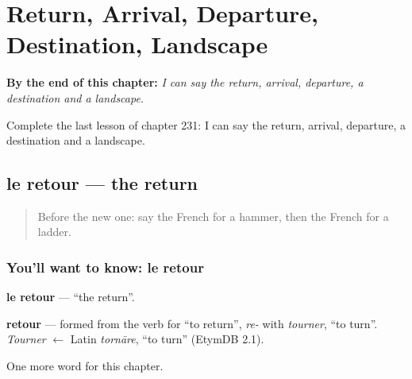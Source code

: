 
\chapter{Return, Arrival, Departure, Destination, Landscape}
\label{ch:fr-return-arrival-departure-destination-landscape}

\begin{chapteropening}
\textbf{By the end of this chapter:} \emph{I can say the return, arrival, departure, a destination and a landscape.}

Complete the last lesson of chapter 231: I can say the return, arrival, departure, a destination and a landscape.
\end{chapteropening}

\section[le retour]{le retour — the return}

\label{lesson:FR-C231-retour}



\begin{quote}
Before the new one: say the French for a hammer, then the French for a ladder.
\end{quote}

\subsection*{You'll want to know: le retour}
\textbf{le retour} — \textquotedblleft{}the return\textquotedblright{}.

\begin{cousinweb}
\textbf{retour} — formed from the verb for \textquotedblleft{}to return\textquotedblright{}, \emph{re-} with \emph{tourner}, \textquotedblleft{}to turn\textquotedblright{}. \emph{Tourner} $\leftarrow$ Latin \emph{tornāre}, \textquotedblleft{}to turn\textquotedblright{} (EtymDB 2.1).
\end{cousinweb}

\begin{grammarlens}[title={What you've built}]
One more word for this chapter.
\end{grammarlens}

